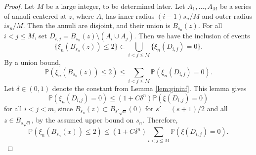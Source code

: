 \documentclass[10pt,a4paper]{amsart}
\def\P{\mathbb P}
\begin{document}
\begin{proof}
Let $M$ be a large integer, to be determined later. Let $A_1, \dots, A_M$ be a series of annuli centered at $z$, where $A_i$ has inner radius $(i-1) s_n/M$ and outer radius $i s_n/M$. Then the annuli are disjoint, and their union is $B_{s_n}(z)$. For all $i < j  \le M$, set $D_{i,j}=  B_{s_n} (z) \setminus ( A_i \cup A_j) $. Then we have the inclusion of events
\[
\{ \xi_n ( B_{s_n} (z)) \le 2 \} \subset \bigcup_{i< j \le M}  \{ \xi_n ( D_{i,j} ) = 0\}. 
\]
By a union bound,
\[
\P ( \xi_n ( B_{s_n} (z)) \le 2) \le \sum_{i<j \le M}  \P( \xi_n ( D_{i,j} ) = 0).
\]
Let $\delta \in (0,1)$ denote the constant from  Lemma \ref{lem:gininf}.  This lemma gives
\[
\P( \xi_n ( D_{i,j} ) = 0) \le (1+ C \delta^n) \P( \xi( D_{i,j} ) = 0)
\]
for all $i  < j < m$, 
since $B_{s_{n}}(z) \subset B_{s' \sqrt{n}}(0)$ for $s ' = (s+1)/2$ and all $z \in B_{s\sqrt{n}}$, by the assumed upper bound on $s_n$. 
Therefore,
\begin{equation}\label{unionbd}
	\P ( \xi_n ( B_{s_n} (x)) \le 2) \le (1+ C \delta^n)  \sum_{i<j \le M}  \P( \xi ( D_{i,j} ) = 0).
\end{equation}



\end{proof}
\end{document}
